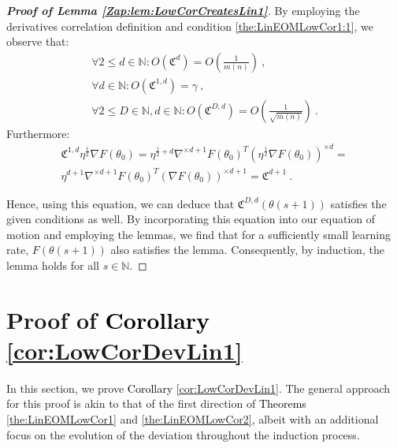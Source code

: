 \documentclass{article} %
\begin{document}
\begin{proof}[\textbf{Proof of Lemma \ref{Zap:lem:LowCorCreatesLin1}}]
By employing the derivatives correlation definition and condition \ref{the:LinEOMLowCor1:1}, we observe that:
\begin{equation}
\begin{array}{c}
\forall 2\leq d\in\mathbb{N}:O\left(\mathfrak{C}^{d}\right)=O\left(\frac{1}{m\left(n\right)}\right)\ , \\
\forall d\in\mathbb{N}:O\left(\mathfrak{C}^{1,d}\right)=\gamma \ , \\
\forall 2\leq D\in\mathbb{N},d\in\mathbb{N}:O\left(\mathfrak{C}^{D,d}\right)=O\left(\frac{1}{\sqrt{m\left(n\right)}}\right) \ .
\end{array}
\label{Zap:eq:TheLastAirBender}
\end{equation}
Furthermore:
\begin{equation}
\begin{array}{c}
\mathfrak{C}^{1,d}\eta^{\frac{1}{2}}\nabla F\left(\theta_{0}\right)=\eta^{\frac{1}{2}+d}\nabla^{\times d+1}F\left(\theta_{0}\right)^{T}\left(\eta^{\frac{1}{2}}\nabla F\left(\theta_{0}\right)\right)^{\times d}=\\
\eta^{d+1}\nabla^{\times d+1}F\left(\theta_{0}\right)^{T}\left(\nabla F\left(\theta_{0}\right)\right)^{\times d+1}=\mathfrak{C}^{d+1} \ .
\end{array}
\end{equation}

Hence, using this equation, we can deduce that \(\mathfrak{C}^{D,d}\left(\theta\left(s+1\right)\right)\) satisfies the given conditions as well. By incorporating this equation into our equation of motion and employing the lemmas, we find that for a sufficiently small learning rate, \(F\left(\theta\left(s+1\right)\right)\) also satisfies the lemma. Consequently, by induction, the lemma holds for all \(s\in\mathbb{N}\).
\end{proof}

\section{Proof of \textcolor{black}{Corollary} \ref{cor:LowCorDevLin1}}
\label{zap:sec:ProofOfCor}

In this section, we prove \textcolor{black}{Corollary} \ref{cor:LowCorDevLin1}. The general approach for this proof is akin to that of the first direction of \textcolor{black}{Theorems} \ref{the:LinEOMLowCor1} and \ref{the:LinEOMLowCor2}, albeit with an additional focus on the evolution of the deviation throughout the induction process.
\end{document}
